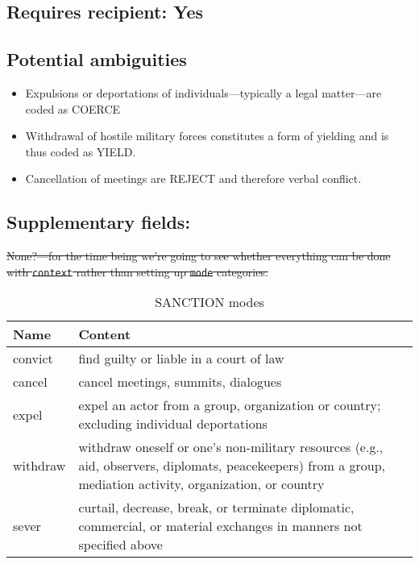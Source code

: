 \documentclass[11pt]{report}
\newcommand{\plcat}[1]{\textsf{#1}}
\begin{document}
\subsection{Requires recipient: Yes}

\subsection{Potential ambiguities}

\begin{itemize}
\item Expulsions or deportations of individuals---typically a legal matter---are coded as \plcat{COERCE} 
\item Withdrawal of hostile military forces constitutes a form of yielding and is thus coded as \plcat{YIELD}.
\item Cancellation of meetings are \plcat{REJECT} and therefore verbal conflict.
\end{itemize}

\subsection{Supplementary fields:}

\sout{None?---for the time being we're going to see whether everything can be done with \texttt{context} rather than setting up \texttt{mode} categories.}

\begin{table}[htp]
\caption{SANCTION modes}
\begin{center}
\begin{tabular}{|l|p{13cm}|}
\hline
Name & Content \\
\hline
convict & find guilty or liable in a court of law\\
cancel & cancel meetings, summits, dialogues  \\
expel & expel an actor from a group, organization or country; excluding individual deportations \\
withdraw & withdraw oneself or one's non-military resources (e.g., aid, observers, diplomats, peacekeepers) from a group, mediation activity, organization, or country\\
sever & curtail, decrease, break, or terminate diplomatic, commercial, or material exchanges in manners not specified above \\
\hline
\end{tabular}
\end{center}
\label{tab:sanctionmode}
\end{table}%
\end{document}
